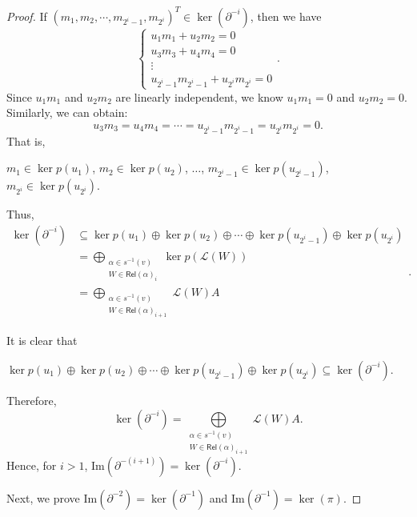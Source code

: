 \documentclass[11pt]{amsart}
\numberwithin{equation}{section}
\theoremstyle{definition}
\begin{document}
\begin{proof}
	If \( (m_1, m_2, \cdots, m_{2^i - 1}, m_{2^i})^T \in \ker (\partial^{-i}) \), then we have
	\[
	\begin{cases}
		u_1 m_1 + u_2 m_2 = 0 \\
		u_3 m_3 + u_4 m_4 = 0 \\
		\vdots \\
		u_{2^i - 1} m_{2^i - 1} + u_{2^i} m_{2^i} = 0
	\end{cases}.
	\]
	Since \( u_1 m_1 \) and \( u_2 m_2 \) are linearly independent, we know \( u_1 m_1 = 0 \) and \( u_2 m_2 = 0 \). Similarly, we can obtain:
	\[
	u_3 m_3 = u_4 m_4 = \cdots = u_{2^i - 1} m_{2^i - 1} = u_{2^i} m_{2^i} = 0.
	\]
	That is, 
	\begin{center}
		\( m_1 \in \ker p(u_1) \), \( m_2 \in \ker p(u_2) \), \(\ldots\), \( m_{2^i - 1} \in \ker p(u_{2^i - 1}) \), \( m_{2^i} \in \ker p(u_{2^i}) \).
	\end{center} 
	Thus,
   \[
	\begin{aligned}
		\ker(\partial^{-i})  &\subseteq \ker p(u_1) \oplus \ker p(u_2) \oplus \cdots \oplus \ker p(u_{2^i - 1}) \oplus \ker p(u_{2^i}) \\
		&= \bigoplus\limits_{\substack{\alpha \in s^{-1}(v) \\ W \in \mathsf{Rel}(\alpha)_i}} \ker p(\mathscr{L}(W))\\ 
		& = \bigoplus\limits_{\substack{\alpha \in s^{-1}(v) \\ W \in \mathsf{Rel}(\alpha)_{i + 1}}} \mathscr{L}(W)A
	\end{aligned}.
	\]
	
	It is clear that 
\begin{center}
	\( \ker p(u_1) \oplus \ker p(u_2) \oplus \cdots \oplus \ker p(u_{2^i - 1}) \oplus \ker p(u_{2^i}) \subseteq \ker(\partial^{-i})  \). 
\end{center}
Therefore, 
     \[
		\ker(\partial^{-i}) = \bigoplus\limits_{\substack{\alpha \in s^{-1}(v) \\ W \in \mathsf{Rel}(\alpha)_{i + 1}}} \mathscr{L}(W)A. 
\] 
	Hence, for \( i > 1 \), \( \text{Im}(\partial^{-(i + 1)}) = \ker(\partial^{-i}) \).
	
	Next, we prove 
	\( \text{Im}(\partial^{-2}) = \ker(\partial^{-1}) \) and \( \text{Im}(\partial^{-1}) = \ker(\pi) \).
	

\end{proof}
\end{document}
